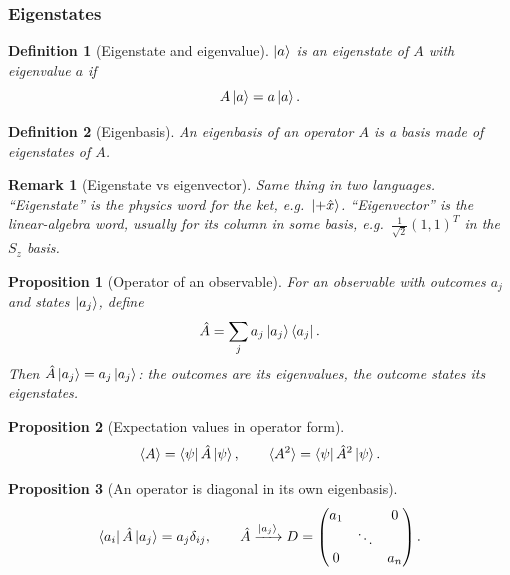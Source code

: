 \documentclass{article}
\newtheorem{definition}{Definition}
\newtheorem{remark}{Remark}
\newtheorem{proposition}{Proposition}
\begin{document}
\subsubsection{Eigenstates}
\begin{definition}[Eigenstate and eigenvalue]
    $\ket{a}$ is an eigenstate of $A$ with eigenvalue $a$ if
    \begin{equation}
        A\ket{a} = a\ket{a}.
    \end{equation}
\end{definition}
\begin{definition}[Eigenbasis]
    An eigenbasis of an operator $A$ is a basis made of eigenstates of $A$.
\end{definition}
\begin{remark}[Eigenstate vs eigenvector]
    Same thing in two languages. ``Eigenstate'' is the physics word for the ket, e.g.\ $\ket{+\hat{x}}$. ``Eigenvector'' is the linear-algebra word, usually for its column in some basis, e.g.\ $\frac{1}{\sqrt{2}}(1,1)^T$ in the $S_z$ basis.
\end{remark}
\begin{proposition}[Operator of an observable]
    For an observable with outcomes $a_j$ and states $\ket{a_j}$, define
    \begin{equation}
        \hat{A} = \sum_j a_j\ket{a_j}\bra{a_j}.
    \end{equation}
    Then $\hat{A}\ket{a_j} = a_j\ket{a_j}$: the outcomes are its eigenvalues, the outcome states its eigenstates.
\end{proposition}
\begin{proposition}[Expectation values in operator form]
    \begin{equation}
        \braket{A} = \bra{\psi}\hat{A}\ket{\psi}, \qquad \braket{A^2} = \bra{\psi}\hat{A}^2\ket{\psi}.
    \end{equation}
\end{proposition}
\begin{proposition}[An operator is diagonal in its own eigenbasis]
    \begin{equation}
        \bra{a_i}\hat{A}\ket{a_j} = a_j\delta_{ij}, \qquad \hat{A} \xrightarrow{\ket{a_j}} D = \begin{pmatrix} a_1 & & 0 \\ & \ddots & \\ 0 & & a_n \end{pmatrix}.
    \end{equation}
\end{proposition}
\end{document}
